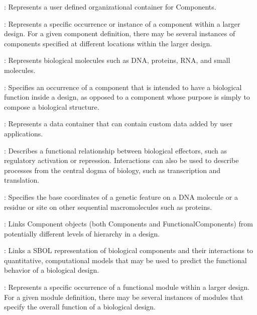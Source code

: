 \begin{description}

\item \emph{}:
Represents a user defined organizational container for Components.

\item \emph{}:
Represents a specific occurrence or instance of a component within a larger design.  For a given component definition, there may be several instances of components specified at different locations within the larger design.

\item \emph{}: Represents biological molecules such as DNA, proteins, RNA, and small molecules.


\item \emph{}:
Specifies an occurrence of a component that is intended to have a biological function inside a design, as opposed to a component whose purpose is simply to compose a biological structure. 

\item \emph{}:
Represents a data container that can contain custom data added by user applications.

\item \emph{}:
Describes a functional relationship between biological effectors, such as regulatory activation or repression.  Interactions can also be used to describe processes from the central dogma of biology, such as transcription and translation.

\item \emph{}:
Specifies the base coordinates of a genetic feature on a DNA molecule or a residue or site on other sequential macromolecules such as proteins.

\item \emph{}:
Links Component objects (both Components and FunctionalComponents) from potentially different levels of hierarchy in a design.

\item \emph{}:
Links a SBOL representation of biological components and their interactions to quantitative, computational models that may be used to predict the functional behavior of a biological design.

\item \emph{}:
Represents a specific occurrence of a functional module within a larger design.  For a given module definition, there may be several instances of modules that specify the overall function of a biological design.



\end{description}

